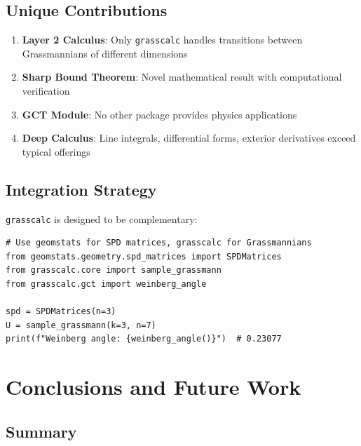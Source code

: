 \documentclass[11pt,a4paper]{article}
\begin{document}
\subsection{Unique Contributions}

\begin{enumerate}
    \item \textbf{Layer 2 Calculus}: Only \texttt{grasscalc} handles transitions between Grassmannians of different dimensions

    \item \textbf{Sharp Bound Theorem}: Novel mathematical result with computational verification

    \item \textbf{GCT Module}: No other package provides physics applications

    \item \textbf{Deep Calculus}: Line integrals, differential forms, exterior derivatives exceed typical offerings
\end{enumerate}

\subsection{Integration Strategy}

\texttt{grasscalc} is designed to be complementary:

\begin{lstlisting}[caption={Integration with other packages}]
# Use geomstats for SPD matrices, grasscalc for Grassmannians
from geomstats.geometry.spd_matrices import SPDMatrices
from grasscalc.core import sample_grassmann
from grasscalc.gct import weinberg_angle

spd = SPDMatrices(n=3)
U = sample_grassmann(k=3, n=7)
print(f"Weinberg angle: {weinberg_angle()}")  # 0.23077
\end{lstlisting}

\section{Conclusions and Future Work}
\label{sec:conclusion}

\subsection{Summary}
\end{document}
